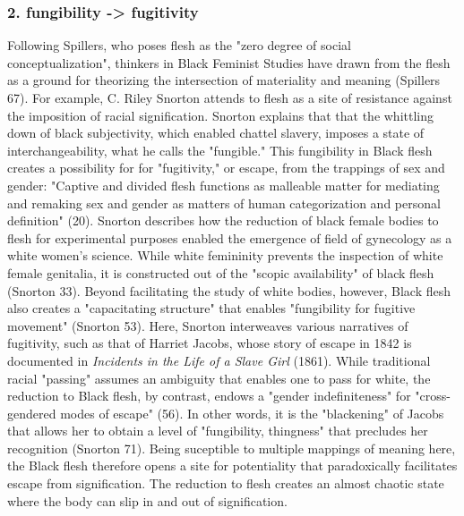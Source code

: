 \documentclass[11pt]{article}
\begin{document}
\subsubsection{2. fungibility -> fugitivity}
\label{sec:org3012942}
Following Spillers, who poses flesh as the "zero degree of social
conceptualization", thinkers in Black Feminist Studies have drawn from
the flesh as a ground for theorizing the intersection of materiality
and meaning (Spillers 67). For example, C. Riley Snorton attends to
flesh as a site of resistance against the imposition of racial
signification. Snorton explains that that the whittling down of black
subjectivity, which enabled chattel slavery, imposes a state of
interchangeability, what he calls the "fungible." This fungibility in
Black flesh creates a possibility for for "fugitivity," or escape,
from the trappings of sex and gender: "Captive and divided flesh
functions as malleable matter for mediating and remaking sex and
gender as matters of human categorization and personal definition"
(20). Snorton describes how the reduction of black female bodies to
flesh for experimental purposes enabled the emergence of field of
gynecology as a white women's science. While white femininity prevents
the inspection of white female genitalia, it is constructed out of the
"scopic availability" of black flesh (Snorton 33). Beyond facilitating
the study of white bodies, however, Black flesh also creates a
"capacitating structure" that enables "fungibility for fugitive
movement" (Snorton 53). Here, Snorton interweaves various narratives
of fugitivity, such as that of Harriet Jacobs, whose story of escape
in 1842 is documented in \emph{Incidents in the Life of a Slave Girl}
(1861). While traditional racial "passing" assumes an ambiguity that
enables one to pass for white, the reduction to Black flesh, by
contrast, endows a "gender indefiniteness" for "cross-gendered modes
of escape" (56). In other words, it is the "blackening" of Jacobs that
allows her to obtain a level of "fungibility, thingness" that
precludes her recognition (Snorton 71). Being suceptible to multiple
mappings of meaning here, the Black flesh therefore opens a site for
potentiality that paradoxically facilitates escape from
signification. The reduction to flesh creates an almost chaotic state
where the body can slip in and out of signification.
\end{document}
